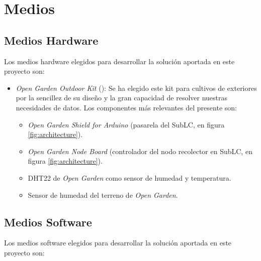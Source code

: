 
\newpage
\section{Medios}
\label{sec:means}

\subsection{Medios Hardware}
\label{subsec:hardware}

Los medios hardware elegidos para desarrollar la solución aportada en este proyecto son:

\begin{itemize}
    \item \textit{Open Garden Outdoor Kit} (\cite{open.garden.01}): Se ha elegido este kit para cultivos de exteriores por la sencillez de su diseño y la gran capacidad de resolver nuestras necesidades de datos. Los componentes más relevantes del presente son:
    \begin{itemize}
        \item \textit{Open Garden Shield for Arduino} (pasarela del SubLC, en figura \ref{fig:architecture}).
        \item \textit{Open Garden Node Board} (controlador del nodo recolector en SubLC, en figura \ref{fig:architecture}).
        \item DHT22 de \textit{Open Garden} como sensor de humedad y temperatura.
        \item Sensor de humedad del terreno de \textit{Open Garden}.
    \end{itemize}
    
\end{itemize}

\subsection{Medios Software}
\label{subsec:Software}

Los medios software elegidos para desarrollar la solución aportada en este proyecto son:


